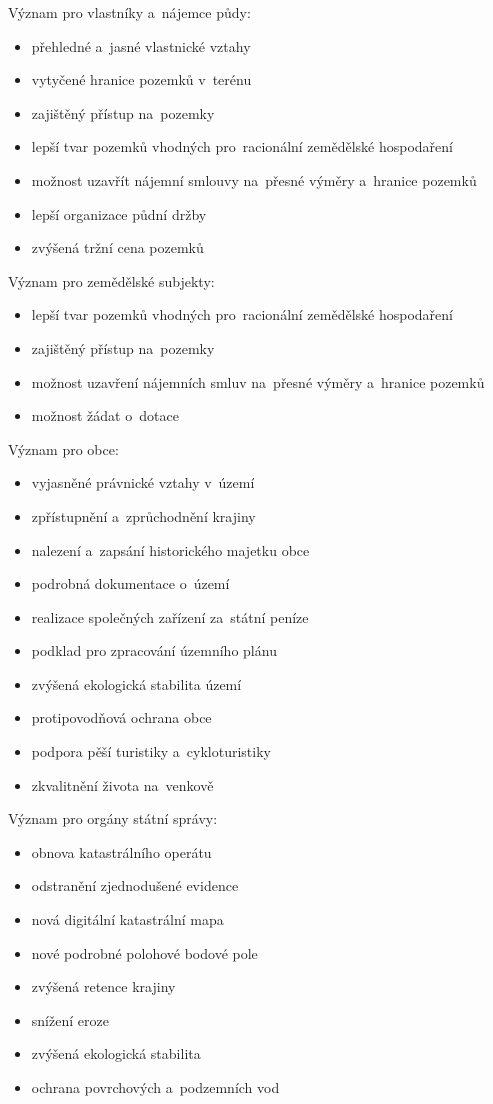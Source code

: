 Význam  pro vlastníky a~nájemce půdy:
	\begin{itemize}[leftmargin=1.5cm, noitemsep]
		\item přehledné a~jasné vlastnické vztahy
		\item vytyčené hranice pozemků v~terénu
		\item zajištěný přístup na~pozemky
		\item lepší tvar pozemků vhodných pro~racionální zemědělské hospodaření
		\item možnost uzavřít nájemní smlouvy na~přesné výměry a~hranice pozemků
		\item lepší organizace půdní držby
		\item zvýšená tržní cena pozemků
	\end{itemize}

Význam  pro zemědělské subjekty:
	\begin{itemize}[leftmargin=1.5cm, noitemsep]
		\item lepší tvar pozemků vhodných pro~racionální zemědělské hospodaření
		\item zajištěný přístup na~pozemky
		\item možnost uzavření nájemních smluv na~přesné výměry a~hranice pozemků
		\item možnost žádat o~dotace
	\end{itemize}

Význam  pro obce:
	\begin{itemize}[leftmargin=1.5cm, noitemsep]
		\item vyjasněné právnické vztahy v~území
		\item zpřístupnění a~zprůchodnění krajiny
		\item nalezení a~zapsání historického majetku obce
		\item podrobná dokumentace o~území
		\item realizace společných zařízení za~státní peníze
		\item podklad pro zpracování územního plánu
		\item zvýšená ekologická stabilita území
		\item protipovodňová ochrana obce
		\item podpora pěší turistiky a~cykloturistiky
		\item zkvalitnění života na~venkově
	\end{itemize}

Význam  pro orgány státní správy:
	\begin{itemize}[leftmargin=1.5cm, noitemsep]
		\item obnova katastrálního operátu
		\item odstranění zjednodušené evidence
		\item nová digitální katastrální mapa
		\item nové podrobné polohové bodové pole
		\item zvýšená retence krajiny
		\item snížení eroze
		\item zvýšená ekologická stabilita
		\item ochrana povrchových a~podzemních vod
	\end{itemize}

